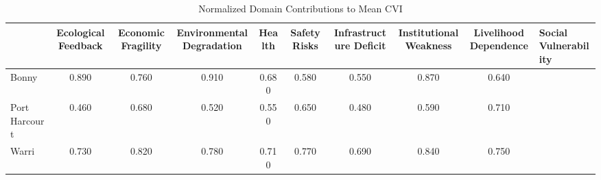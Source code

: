 \begin{table}[h]
\centering
\caption{Normalized Domain Contributions to Mean CVI}
\label{tab:sence_domains}
\begin{tabular}{lcccccccc}
\hline
 & Ecological Feedback & Economic Fragility & Environmental Degradation & Health & Safety Risks & Infrastructure Deficit & Institutional Weakness & Livelihood Dependence & Social Vulnerability \\
\hline
Bonny & 0.890 & 0.760 & 0.910 & 0.680 & 0.580 & 0.550 & 0.870 & 0.640 \\
Port Harcourt & 0.460 & 0.680 & 0.520 & 0.550 & 0.650 & 0.480 & 0.590 & 0.710 \\
Warri & 0.730 & 0.820 & 0.780 & 0.710 & 0.770 & 0.690 & 0.840 & 0.750 \\
\hline
\end{tabular}
\end{table}